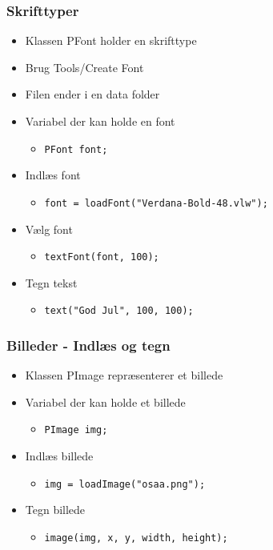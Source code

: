 \documentclass{beamer}
\begin{document}
\begin{frame}[fragile]
  \frametitle{Skrifttyper}
  \begin{itemize}
  \item Klassen PFont holder en skrifttype
  \item Brug Tools/Create Font
  \item Filen ender i en data folder
  \item Variabel der kan holde en font
    \begin{itemize}
    \item \texttt{PFont font;}
    \end{itemize}
  \item Indlæs font
    \begin{itemize}
    \item \texttt{font = loadFont("Verdana-Bold-48.vlw");}
    \end{itemize}
  \item Vælg font
    \begin{itemize}
    \item \texttt{textFont(font, 100);}
    \end{itemize}
  \item Tegn tekst
    \begin{itemize}
    \item \texttt{text("God Jul", 100, 100);}
    \end{itemize}
  \end{itemize}
\end{frame}



\begin{frame}[fragile]
  \frametitle{Billeder - Indlæs og tegn}
  \begin{itemize}
  \item Klassen PImage repræsenterer et billede
  \item Variabel der kan holde et billede
    \begin{itemize}
    \item \texttt{PImage img;}
    \end{itemize}
  \item Indlæs billede
    \begin{itemize}
    \item \texttt{img = loadImage("osaa.png");}
    \end{itemize}
  \item Tegn billede
    \begin{itemize}
    \item \texttt{image(img, x, y, width, height);}
    \end{itemize}
  \end{itemize}
\end{frame}
\end{document}
